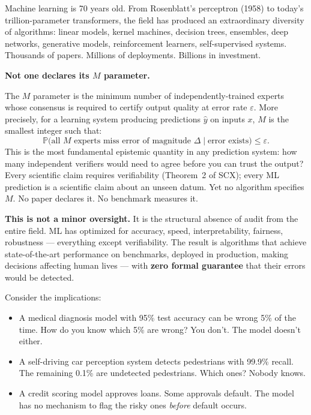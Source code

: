\documentclass[12pt,a4paper]{article}
\theoremstyle{definition}
\newcommand{\SCX}{\textsc{SCX}}
\newcommand{\Pbb}{\mathbb{P}}
\begin{document}
Machine learning is 70 years old. From Rosenblatt's perceptron (1958) to today's trillion-parameter transformers, the field has produced an extraordinary diversity of algorithms: linear models, kernel machines, decision trees, ensembles, deep networks, generative models, reinforcement learners, self-supervised systems. Thousands of papers. Millions of deployments. Billions in investment.

\textbf{Not one declares its $M$ parameter.}

The $M$ parameter is the minimum number of independently-trained experts whose consensus is required to certify output quality at error rate $\varepsilon$. More precisely, for a learning system producing predictions $\hat{y}$ on inputs $x$, $M$ is the smallest integer such that:
\begin{equation}\label{eq:M_def}
    \Pbb\bigl(\text{all } M \text{ experts miss error of magnitude } \Delta \mid \text{error exists}\bigr) \le \varepsilon.
\end{equation}
This is the most fundamental epistemic quantity in any prediction system: how many independent verifiers would need to agree before you can trust the output? Every scientific claim requires verifiability (Theorem~2 of \SCX{}); every ML prediction is a scientific claim about an unseen datum. Yet no algorithm specifies $M$. No paper declares it. No benchmark measures it.

\medskip
\noindent\textbf{This is not a minor oversight.} It is the structural absence of audit from the entire field. ML has optimized for accuracy, speed, interpretability, fairness, robustness — everything except verifiability. The result is algorithms that achieve state-of-the-art performance on benchmarks, deployed in production, making decisions affecting human lives — with \textbf{zero formal guarantee} that their errors would be detected.

Consider the implications:
\begin{itemize}[nosep]
    \item A medical diagnosis model with 95\% test accuracy can be wrong 5\% of the time. How do you know which 5\% are wrong? You don't. The model doesn't either.
    \item A self-driving car perception system detects pedestrians with 99.9\% recall. The remaining 0.1\% are undetected pedestrians. Which ones? Nobody knows.
    \item A credit scoring model approves loans. Some approvals default. The model has no mechanism to flag the risky ones \textit{before} default occurs.
\end{itemize}
\end{document}
